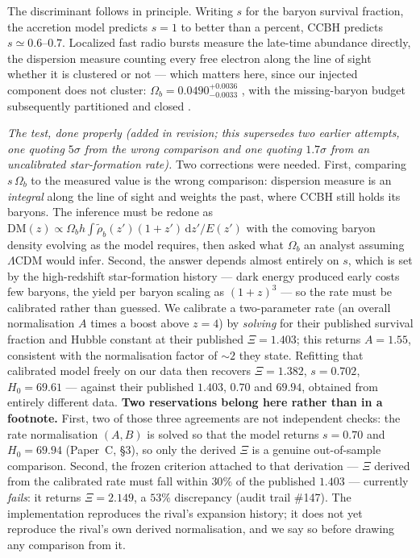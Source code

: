 \documentclass[11pt]{article}
\begin{document}
The discriminant follows in principle. Writing $s$ for the baryon survival fraction, the accretion
model predicts $s = 1$ to better than a percent, CCBH predicts $s \simeq 0.6$--$0.7$. Localized fast
radio bursts measure the late-time abundance directly, the dispersion measure counting every free
electron along the line of sight whether it is clustered or not --- which matters here, since our
injected component does not cluster: $\Omega_b = 0.0490^{+0.0036}_{-0.0033}$ \cite{Yang2022}, with
the missing-baryon budget subsequently partitioned and closed \cite{Connor2025}.

\emph{The test, done properly (added in revision; this supersedes two earlier attempts, one
quoting $5\sigma$ from the wrong comparison and one quoting $1.7\sigma$ from an uncalibrated
star-formation rate).} Two corrections were needed. First, comparing $s\,\Omega_b$ to the measured
value is the wrong comparison: dispersion measure is an \emph{integral} along the line of sight and
weights the past, where CCBH still holds its baryons. The inference must be redone as
$\mathrm{DM}(z) \propto \Omega_b h\!\int \tilde\rho_b(z')(1+z')\,\mathrm{d}z'/E(z')$ with the
comoving baryon density evolving as the model requires, then asked what $\Omega_b$ an analyst
assuming $\Lambda$CDM would infer. Second, the answer depends almost entirely on $s$, which is set
by the high-redshift star-formation history --- dark energy produced early costs few baryons, the
yield per baryon scaling as $(1+z)^3$ --- so the rate must be calibrated rather than guessed. We
calibrate a two-parameter rate (an overall normalisation $A$ times a boost above $z=4$) by
\emph{solving} for their published survival fraction and Hubble constant at their published
$\Xi = 1.403$; this returns $A = 1.55$, consistent with the normalisation factor of $\sim\!2$ they
state. Refitting that calibrated model freely on our data then recovers
$\Xi = 1.382$, $s = 0.702$, $H_0 = 69.61$ --- against their published $1.403$, $0.70$ and
$69.94$, obtained from entirely different data. \textbf{Two reservations belong here rather than in a footnote.} First, two of those three agreements are not independent checks: the rate normalisation $(A,B)$ is solved so that the model returns $s = 0.70$ and $H_0 = 69.94$ (Paper~C, \S3), so only the derived $\Xi$ is a genuine out-of-sample comparison. Second, the frozen criterion attached to that derivation --- $\Xi$ derived from the calibrated rate must fall within $30\%$ of the published $1.403$ --- currently \emph{fails}: it returns $\Xi = 2.149$, a $53\%$ discrepancy (audit trail \#147). The implementation reproduces the rival's expansion history; it does not yet reproduce the rival's own derived normalisation, and we say so before drawing any comparison from it.
\end{document}
